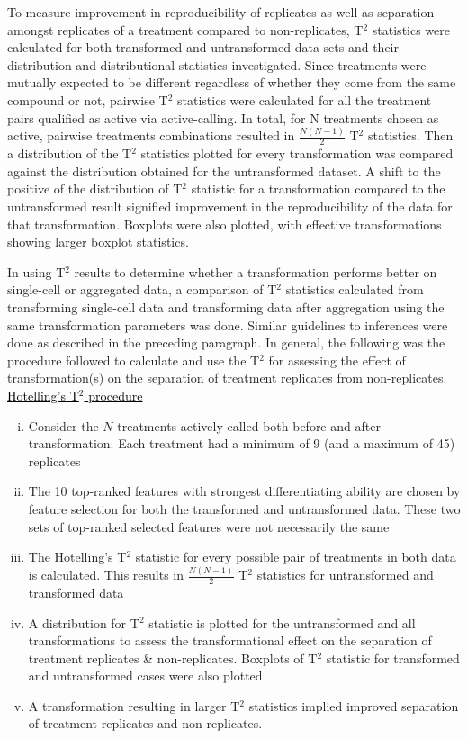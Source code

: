 \documentclass[11pt]{article}
\begin{document}
\par{To measure improvement in reproducibility of replicates as well as separation amongst replicates of a treatment compared to non-replicates, T$^2$ statistics were calculated for both transformed and untransformed data sets and their distribution and distributional statistics investigated. Since treatments were mutually expected to be different regardless of whether they come from the same compound or not, pairwise T$^2$ statistics were calculated for all the treatment pairs qualified as active via active-calling. In total, for N treatments chosen as active, pairwise treatments combinations resulted in $\frac{N(N-1)}{2}$ T$^2$ statistics. Then a distribution of the T$^2$ statistics plotted for every transformation was compared against the distribution obtained for the untransformed dataset. A shift to the positive of the distribution of T$^2$ statistic for a transformation compared to the untransformed result signified improvement in the reproducibility of the data for that transformation. Boxplots were also plotted, with effective transformations showing larger boxplot statistics.
}
\par{In using T$^2$ results to determine whether a transformation performs better on single-cell or aggregated data, a comparison of T$^2$ statistics calculated from transforming single-cell data and transforming data after aggregation using the same transformation parameters was done. Similar guidelines to inferences were done as described in the preceding paragraph. In general, the following was the procedure followed to calculate and use the T$^2$ for assessing the effect of transformation(s) on the separation of treatment replicates from non-replicates. \\

\textcolor{black}{\underline{Hotelling's T$^2$ procedure}}
\begin{enumerate}[i.]
\item{Consider the $N$ treatments actively-called both before and after transformation. Each treatment had a minimum of 9 (and a maximum of 45) replicates} %
\item{The 10 top-ranked features with strongest differentiating ability are chosen by feature selection for both the transformed and untransformed data. These two sets of top-ranked selected features were not necessarily the same}
\item The Hotelling's T$^2$ statistic for every possible pair of treatments in both data is calculated. This results in $\frac{N(N-1)}{2}$ T$^2$ statistics for untransformed and transformed data 
\item A distribution for T$^2$ statistic is plotted for the untransformed and all transformations to assess the transformational effect on the separation of treatment replicates \& non-replicates. Boxplots of T$^2$ statistic for transformed and untransformed cases were also plotted %
\item A transformation resulting in larger T$^2$ statistics implied improved separation of treatment replicates and non-replicates. 
\end{enumerate}
}
\end{document}
